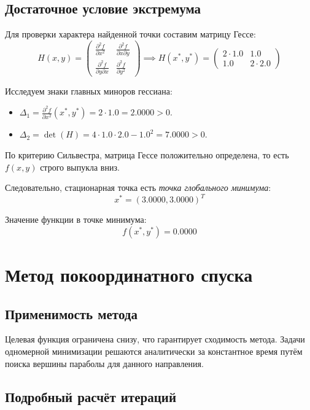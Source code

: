 \documentclass[12pt]{article}
\begin{document}
\subsection{Достаточное условие экстремума}

Для проверки характера найденной точки составим матрицу Гессе:
\begin{equation*}
H(x, y) = \begin{pmatrix}
    \frac{\partial^2 f}{\partial x^2} & \frac{\partial^2 f}{\partial x \partial y} \\[1ex]
    \frac{\partial^2 f}{\partial y \partial x} & \frac{\partial^2 f}{\partial y^2}
\end{pmatrix}
\implies H(x^\ast, y^\ast)=
\begin{pmatrix}
    2 \cdot 1.0 & 1.0 \\
    1.0 & 2 \cdot 2.0
\end{pmatrix}
\end{equation*}

Исследуем знаки главных миноров гессиана:
\begin{itemize}
    \item \( \Delta_1 = \frac{\partial^2 f}{\partial x^2}(x^\ast,y^\ast) = 2 \cdot 1.0 = 2.0000>0 \).
    \item \( \Delta_2 = \det(H) = 4 \cdot 1.0 \cdot 2.0 - 1.0^2 = 7.0000>0 \).
\end{itemize}

По критерию Сильвестра, матрица Гессе положительно определена, то есть \( f(x,y) \) строго выпукла вниз.

Следовательно, стационарная точка есть \textit{точка глобального минимума}:
\[
x^* = (3.0000, 3.0000)^T
\]

Значение функции в точке минимума:
\[
f(x^*, y^*) = 0.0000
\]

\newpage
\section{Метод покоординатного спуска}

\subsection{Применимость метода}

Целевая функция ограничена снизу, что гарантирует сходимость метода. Задачи одномерной минимизации решаются аналитически за константное время путём поиска вершины параболы для данного направления.

\subsection{Подробный расчёт итераций}
\end{document}
